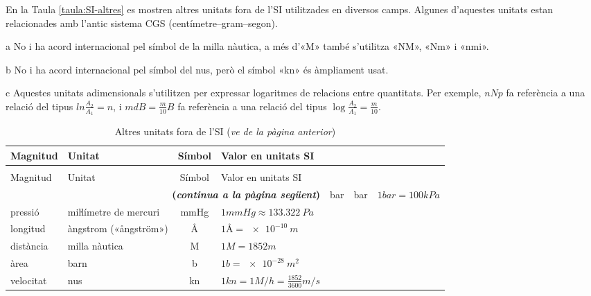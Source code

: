 En la Taula \vref{taula:SI-altres} es mostren altres unitats fora de l'SI utilitzades en diversos camps. Algunes d'aquestes unitats estan relacionades amb l'antic sistema CGS (centímetre--gram--segon).

\begin{ThreePartTable}
\begin{TableNotes}
    \item[a] {\footnotesize No i ha acord internacional pel símbol de la milla nàutica, a més d'«M» també s'utilitza «NM», «Nm» i «nmi».}
    \item[b] {\footnotesize No i ha acord internacional pel símbol del nus, però el símbol «kn» és àmpliament usat.}
    \item[c] {\footnotesize Aquestes unitats adimensionals s'utilitzen per expressar logaritmes de relacions entre quantitats. Per exemple, $n\unit{Np}$ fa referència a una relació del tipus $ln\frac{A_2}{A_1}= n$, i  $ m \unit{dB} =\frac{m}{10}\unit{B}$  fa referència a una relació del tipus $\log\frac{A_2}{A_1} =\frac{m}{10}$.}
\end{TableNotes}
\begin{longtable}[h]{llcl}
   \caption{\label{taula:SI-altres} Altres unitats fora de l'SI}\\
   \toprule[1pt]
    Magnitud & Unitat &  Símbol & Valor en unitats SI\\
   \midrule
   \endfirsthead
   \caption[]{Altres unitats fora de l'SI (\emph{ve de la pàgina
   anterior})}\\
   \toprule[1pt]
    Magnitud & Unitat &  Símbol & Valor en unitats SI\\
   \midrule
   \endhead
   \midrule
   \multicolumn{4}{r}{\sffamily\bfseries\color{NavyBlue}(\emph{continua a la pàgina següent})}
   \endfoot
   \insertTableNotes
   \endlastfoot
    pressió & bar & \si{bar} & $1\unit{bar} = 100\unit{kPa}$ \\
    pressió & miŀlímetre de mercuri & \si{mmHg} & $1\unit{mmHg} \approx \SI{133,322}{Pa}$ \\
    longitud & àngstrom («ångström») & $\si{\angstrom}$ & $1\unit{\angstrom} = \SI{e-10}{m}$\\
    distància & milla nàutica\tnote{a} &  \si{M} & $1\unit{M} = 1852\unit{m}$ \\
    àrea & barn & \si{b} &  $1\unit{b} = \SI{e-28}{m^2}$\\
    velocitat & nus\tnote{b} & \si{kn} & $1\unit{kn} = 1\unit{M/h} = \frac{1852}{3600}\unit{m/s}$ \\

\end{longtable}
\end{ThreePartTable}
